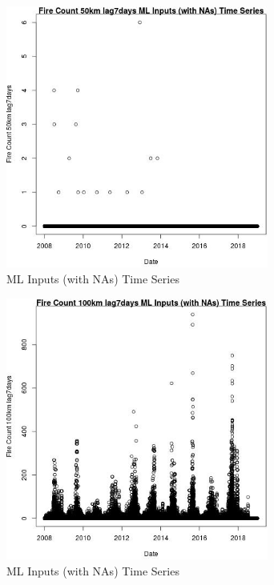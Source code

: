 \begin{figure} 
\centering  
\includegraphics[width=0.77\textwidth]{Code_Outputs/Report_ML_input_PM25_Step4_part_e_de_duplicated_aves_compiled_2019-05-21wNAs_Fire_Count_50km_lag7daysvDate.jpg} 
\caption{\label{fig:Report_ML_input_PM25_Step4_part_e_de_duplicated_aves_compiled_2019-05-21wNAsFire_Count_50km_lag7daysvDate}ML Inputs (with NAs) Time Series} 
\end{figure} 
 

\begin{figure} 
\centering  
\includegraphics[width=0.77\textwidth]{Code_Outputs/Report_ML_input_PM25_Step4_part_e_de_duplicated_aves_compiled_2019-05-21wNAs_Fire_Count_100km_lag7daysvDate.jpg} 
\caption{\label{fig:Report_ML_input_PM25_Step4_part_e_de_duplicated_aves_compiled_2019-05-21wNAsFire_Count_100km_lag7daysvDate}ML Inputs (with NAs) Time Series} 
\end{figure} 
 

